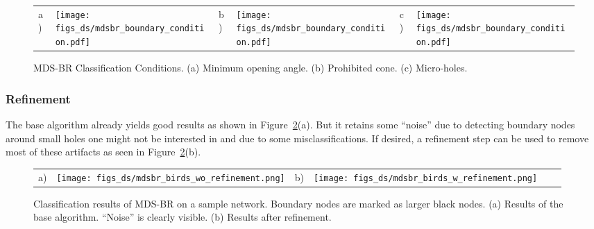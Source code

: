 \documentclass{llncs}
\begin{document}
\begin{figure}[t]
\centering
\begin{tabular}{llllll}
 a) \hspace{0.2cm} &
\parbox[c]{.2\columnwidth}{\texttt{[image: figs\_ds/mdsbr\_boundary\_condition.pdf]}} &
\hspace{0.7cm}  b) \hspace{0.2cm} &
\parbox[c]{.2\columnwidth}{\texttt{[image: figs\_ds/mdsbr\_boundary\_condition.pdf]}} &
\hspace{0.7cm}  c) \hspace{0.2cm} &
\parbox[c]{.2\columnwidth}{\texttt{[image: figs\_ds/mdsbr\_boundary\_condition.pdf]}}
\end{tabular}
\caption{MDS-BR Classification Conditions. (a) Minimum opening angle. (b) Prohibited cone. (c) Micro-holes.}
\label{fig:bn_definition}
\end{figure}


\subsubsection{Refinement}
The base algorithm already yields good results as shown in Figure~\ref{fig:tlbr_refinement}(a).
But it retains some ``noise'' due to detecting boundary nodes around small holes one might not be interested in and due to some misclassifications.
If desired, a refinement step can be used to remove most of these artifacts as seen in Figure~\ref{fig:tlbr_refinement}(b).

\begin{figure}[b]
\centering
\begin{tabular}{llllll}
 a) \hspace{0.2cm} &
\parbox[c]{.2\columnwidth}{\texttt{[image: figs\_ds/mdsbr\_birds\_wo\_refinement.png]}} &
\hspace{1cm}  b) \hspace{0.2cm} &
\parbox[c]{.2\columnwidth}{\texttt{[image: figs\_ds/mdsbr\_birds\_w\_refinement.png]}}
\hspace{0.3cm}
\end{tabular}
\caption{Classification results of MDS-BR on a sample network. Boundary nodes are marked as larger black nodes. (a) Results of the base algorithm. ``Noise'' is clearly visible. (b) Results after refinement.}
\label{fig:tlbr_refinement}
\end{figure}
\end{document}
